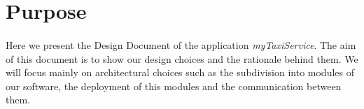 \section{Purpose}
\paragraph{} Here we present the Design Document of the application \textit{myTaxiService}. The aim of this document is to show our design choices and the rationale behind them. We will focus mainly on architectural choices such as the subdivision into modules of our software, the deployment of this modules and the communication between them.\\ 
